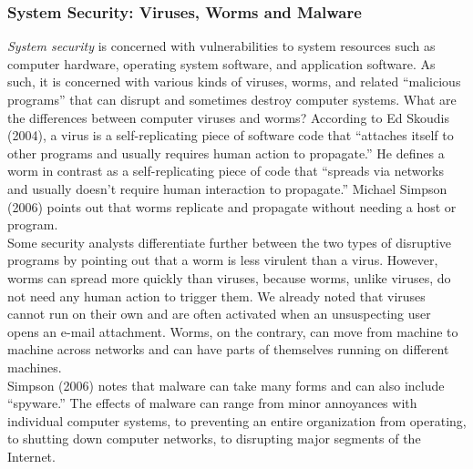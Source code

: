 \documentclass[12pt]{article}
\theoremstyle{definition}
\begin{document}
\subsubsection{System Security: Viruses, Worms and Malware}
\textit{System security} is concerned with vulnerabilities to system resources such as computer
hardware, operating system software, and application software. As such, it is concerned
with various kinds of viruses, worms, and related “malicious programs” that can disrupt
and sometimes destroy computer systems. What are the differences between computer
viruses and worms? According to Ed Skoudis (2004), a virus is a self-replicating piece of
software code that “attaches itself to other programs and usually requires human action
to propagate.” He defines a worm in contrast as a self-replicating piece of code that
“spreads via networks and usually doesn’t require human interaction to propagate.” Michael Simpson (2006) points out that worms replicate and propagate without needing a
host or program.\\
Some security analysts differentiate further between the two types of disruptive
programs by pointing out that a worm is less virulent than a virus. However, worms can
spread more quickly than viruses, because worms, unlike viruses, do not need any human
action to trigger them. We already noted that viruses cannot run on their own and are
often activated when an unsuspecting user opens an e-mail attachment. Worms, on the
contrary, can move from machine to machine across networks and can have parts of
themselves running on different machines.\\
Simpson (2006) notes that malware can take many forms and can also include
“spyware.” The effects of malware can range from minor annoyances with individual
computer systems, to preventing an entire organization from operating, to shutting down
computer networks, to disrupting major segments of the Internet.
\end{document}
